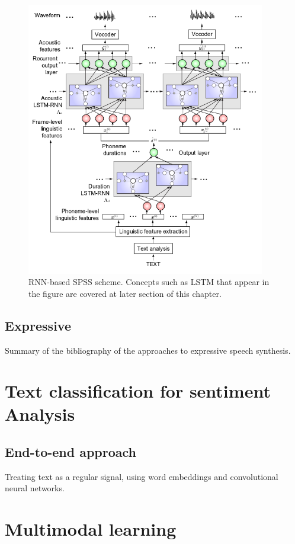 \begin{figure}[h]
\centering
    \includegraphics[height=12cm]{figures/rnn-tts}
    \caption{RNN-based SPSS scheme. Concepts such as LSTM that appear in the figure are covered at later section of this chapter.}
    \label{fig:rnn-tts-0}
\end{figure}

\subsection{Expressive}

Summary of the bibliography of the approaches to expressive speech synthesis.

\section{Text classification for sentiment Analysis}


\subsection{End-to-end approach}

Treating text as a regular signal, using word embeddings and convolutional neural networks.

\section{Multimodal learning}

